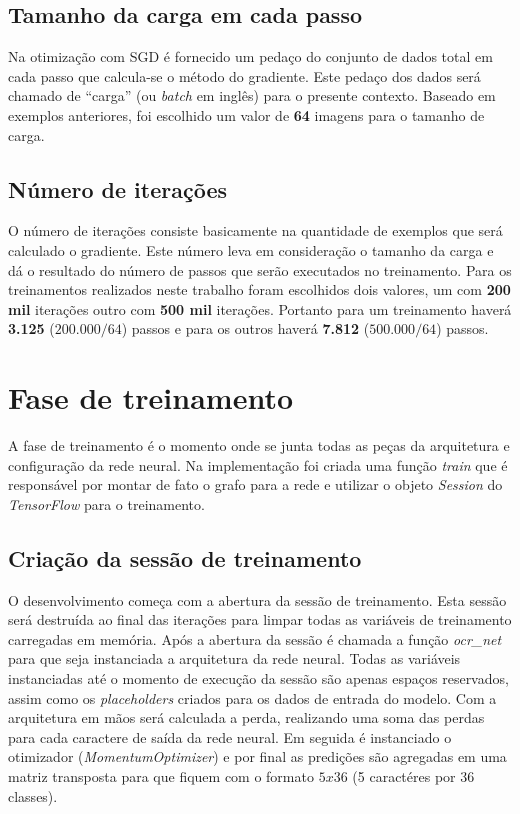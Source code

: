 \subsection{Tamanho da carga em cada passo}

Na otimização com SGD é fornecido um pedaço do conjunto de dados
total em cada passo que calcula-se o método do gradiente. Este pedaço
dos dados será chamado de ``carga'' (ou \textit{batch} em inglês) para
o presente contexto. Baseado em exemplos anteriores, foi escolhido um
valor de {\bf 64} imagens para o tamanho de carga.

\subsection{Número de iterações}

O número de iterações consiste basicamente na quantidade de exemplos
que será calculado o gradiente. Este número leva em consideração o
tamanho da carga e dá o resultado do número de passos que serão
executados no treinamento. Para os treinamentos realizados neste
trabalho foram escolhidos dois valores, um com {\bf 200 mil} iterações
outro com {\bf 500 mil} iterações. Portanto para um treinamento
haverá {\bf 3.125} ($200.000 / 64$) passos e para os outros haverá
{\bf 7.812} ($500.000 / 64$) passos.

\section{Fase de treinamento} \label{treino}

A fase de treinamento é o momento onde se junta todas as peças da
arquitetura e configuração da rede neural. Na implementação foi
criada uma função \textit{train} que é responsável por montar de fato
o grafo para a rede e utilizar o objeto \textit{Session} do
\textit{TensorFlow} para o treinamento.

\subsection{Criação da sessão de treinamento}

O desenvolvimento começa com a abertura da sessão de treinamento. Esta
sessão será destruída ao final das iterações para limpar todas as
variáveis de treinamento carregadas em memória. Após a abertura da
sessão é chamada a função \textit{ocr\_net} para que seja instanciada a
arquitetura da rede neural. Todas as variáveis instanciadas até o
momento de execução da sessão são apenas espaços reservados, assim
como os \textit{placeholders} criados para os dados de entrada do
modelo. Com a arquitetura em mãos será calculada a perda, realizando
uma soma das perdas para cada caractere de saída da rede neural. Em
seguida é instanciado o otimizador (\textit{MomentumOptimizer}) e por
final as predições são agregadas em uma matriz transposta para que
fiquem com o formato $5x36$ (5 caractéres por 36 classes).

